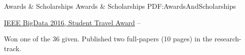 
\Section
{Awards \&\newline
Scholarships}
{Awards \& Scholarships}
{PDF:AwardsAndScholarships}

\BulletItem
\href{http://cci.drexel.edu/bigdata/bigdata2016/StudentTravelAward.html}{
IEEE BigData 2016, Student Travel Award}
\hfill
{} --
\begin{Detail}
	\SubBulletItem
	Won one of the 36 given.
	\SubBulletItem
	Published two full-papers (10 pages) in the research-track.
\end{Detail}